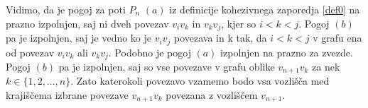 \documentclass[a4paper, 12pt]{book}
\begin{document}


Vidimo, da je pogoj za poti $P_n$ $(a)$ iz definicije kohezivnega zaporedja \ref{def0} na prazno izpolnjen, saj ni dveh povezav $v_iv_k$ in $v_kv_j$, kjer so $i < k < j$. Pogoj $(b)$ pa je izpolnjen, saj je vedno ko je $v_iv_j$ povezava in k tak, da $i < k < j$ v grafu ena od povezav $v_iv_k$ ali $v_kv_j$. Podobno je pogoj $(a)$ izpolnjen na prazno za zvezde. Pogoj $(b)$ pa je izpolnjen, saj so vse povezave v grafu oblike $v_{n+1}v_k$ za nek $k \in \{ 1, 2, ..., n \}$. Zato katerokoli povezavo vzamemo bodo vsa vozlišča med krajiščema izbrane povezave $v_{n+1}v_k$ povezana z vozliščem $v_{n+1}$.
\end{document}
